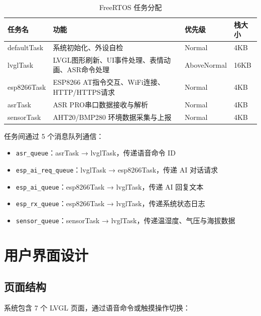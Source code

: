 \documentclass[12pt,a4paper]{ctexart}
\begin{document}
\begin{table}[H]
\centering
\begin{tabularx}{\textwidth}{lXXl}
\toprule
\textbf{任务名} & \textbf{功能} & \textbf{优先级} & \textbf{栈大小} \\
\midrule
defaultTask & 系统初始化、外设自检 & Normal & 4KB \\
lvglTask & LVGL图形刷新、UI事件处理、表情动画、ASR命令处理 & AboveNormal & 16KB \\
esp8266Task & ESP8266 AT指令交互、WiFi连接、HTTP/HTTPS请求 & Normal & 4KB \\
asrTask & ASR PRO串口数据接收与解析 & Normal & 4KB \\
sensorTask & AHT20/BMP280 环境数据采集与上报 & Normal & 4KB \\
\bottomrule
\end{tabularx}
\caption{FreeRTOS 任务分配}
\end{table}

任务间通过 5 个消息队列通信：

\begin{itemize}
    \item \texttt{asr\_queue}：asrTask → lvglTask，传递语音命令 ID
    \item \texttt{esp\_ai\_req\_queue}：lvglTask → esp8266Task，传递 AI 对话请求
    \item \texttt{esp\_ai\_queue}：esp8266Task → lvglTask，传递 AI 回复文本
    \item \texttt{esp\_rx\_queue}：esp8266Task → lvglTask，传递系统状态日志
    \item \texttt{sensor\_queue}：sensorTask → lvglTask，传递温湿度、气压与海拔数据
\end{itemize}

\section{用户界面设计}

\subsection{页面结构}

系统包含 7 个 LVGL 页面，通过语音命令或触摸操作切换：
\end{document}
